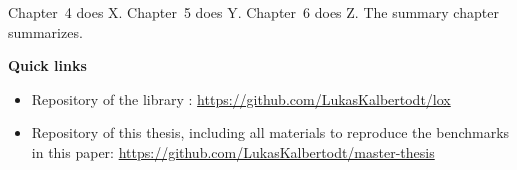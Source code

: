 Chapter~4 does X. Chapter~5 does Y. Chapter~6 does Z. The summary chapter summarizes.


\vfill

\textbf{Quick links}
\begin{itemize}
  \item Repository of the library : \url{https://github.com/LukasKalbertodt/lox}
  \item Repository of this thesis, including all materials to reproduce the benchmarks in this paper: \url{https://github.com/LukasKalbertodt/master-thesis}
\end{itemize}

\vspace{2cm}


